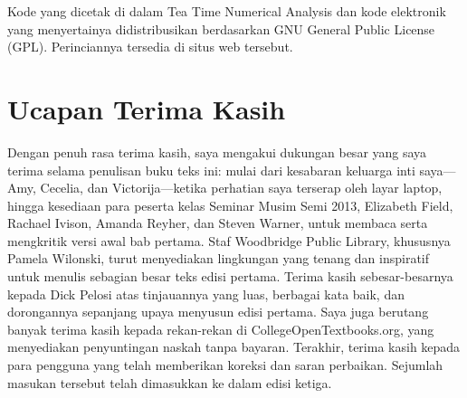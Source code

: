 \noindent Kode yang dicetak di dalam Tea Time Numerical Analysis dan
kode elektronik yang menyertainya didistribusikan berdasarkan GNU
General Public License (GPL). Perinciannya tersedia di situs web tersebut.

\section*{Ucapan Terima Kasih}


Dengan penuh rasa terima kasih, saya mengakui dukungan besar yang
saya terima selama penulisan buku teks ini: mulai dari kesabaran keluarga
inti saya---Amy, Cecelia, dan Victorija---ketika perhatian saya
terserap oleh layar laptop, hingga kesediaan para peserta kelas Seminar
Musim Semi 2013, Elizabeth Field, Rachael Ivison, Amanda Reyher, dan
Steven Warner, untuk membaca serta mengkritik versi awal bab pertama.
Staf Woodbridge Public Library, khususnya Pamela Wilonski, turut menyediakan
lingkungan yang tenang dan inspiratif untuk menulis sebagian besar
teks edisi pertama. Terima kasih sebesar-besarnya kepada Dick Pelosi
atas tinjauannya yang luas, berbagai kata baik, dan dorongannya sepanjang
upaya menyusun edisi pertama. Saya juga berutang banyak terima kasih
kepada rekan-rekan di CollegeOpenTextbooks.org, yang menyediakan penyuntingan
naskah tanpa bayaran. Terakhir, terima kasih kepada para pengguna
yang telah memberikan koreksi dan saran perbaikan. Sejumlah masukan
tersebut telah dimasukkan ke dalam edisi ketiga.
